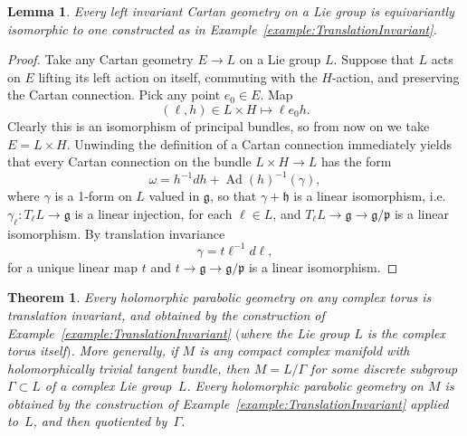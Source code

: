 \documentclass[11pt]{article}
\newtheorem{theorem}{Theorem}
\newtheorem{lemma}{Lemma}
\DeclareMathOperator{\Ad}{Ad}
\newcommand{\LieG}{\ensuremath{\mathfrak{g}}}
\newcommand{\LieH}{\ensuremath{\mathfrak{h}}}
\newcommand{\gtot}{\mathfrak{g}}
\newcommand{\gstruc}{\mathfrak{p}}
\begin{document}
\begin{lemma} Every left invariant Cartan geometry on a
Lie group is equivariantly isomorphic to one
constructed as in Example~{\rm \ref{example:TranslationInvariant}}.
\end{lemma}
\begin{proof}
Take any Cartan geometry $E \to L$ on a Lie group $L$.
Suppose that $L$ acts on $E$ lifting its left action
on itself, commuting with the $H$-action,
and preserving the Cartan connection.
Pick any point $e_0 \in E$. Map
\[
\left(\ell,h\right) \in L \times H \mapsto \ell e_0 h.
\]
Clearly this is an isomorphism of principal bundles,
so from now on we take $E=L \times H$.
Unwinding the def\/inition of a Cartan connection immediately yields
that every Cartan connection on the bundle $L \times H \to L$ has the form
\[
\omega = h^{-1}   dh + \Ad(h)^{-1} \left(\gamma\right),
\]
where $\gamma$ is a 1-form on $L$ valued in $\LieG$,
so that $\gamma+\LieH$ is a linear isomorphism,
i.e.\ $\gamma_{\ell} : T_{\ell} L \to \gtot$ is a
linear injection, for each $\ell \in L$, and
$T_{\ell} L \to \gtot \to \gtot/\gstruc$ is a linear isomorphism.
By translation invariance
\[
\gamma = t \ell^{-1}   d\ell,
\]
for a unique linear map $t$ and
$t \to \gtot \to \gtot/\gstruc$ is a linear isomorphism.
\end{proof}

\begin{theorem}\label{theorem:translation}
Every holomorphic parabolic geometry on any complex torus is translation
inva\-riant, and obtained by the construction of
Example~{\rm \ref{example:TranslationInvariant}}
$($where the Lie group $L$ is the complex torus itself$)$.
More generally, if $M$ is any compact complex
manifold with holomorphically trivial tangent bundle,
then $M=L/\Gamma$ for some discrete
subgroup $\Gamma \subset L$ of a complex
Lie group~$L$. Every holomorphic parabolic geometry
on $M$ is obtained by the construction of
Example~{\rm \ref{example:TranslationInvariant}}
applied to~$L$, and then quotiented by~$\Gamma$.
\end{theorem}
\end{document}
